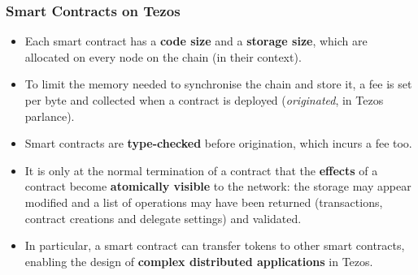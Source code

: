 \documentclass[compress,dvips,xcolor={dvipsnames},t]{beamer}
\begin{document}
\begin{frame}
  \frametitle{Smart Contracts on Tezos}

  \begin{itemize}

    \item Each smart contract has a \textbf{code size} and a
      \textbf{storage size}, which are allocated on every node on the
      chain (in their context).

    \item To limit the memory needed to synchronise the chain and
      store it, a fee is set per byte and collected when a contract is
      deployed (\emph{originated}, in Tezos parlance).

      \item Smart contracts are \textbf{type\hyp{}checked} before
        origination, which incurs a fee too.

    \item It is only at the normal termination of a contract that the
      \textbf{effects} of a contract become \textbf{atomically
        visible} to the network: the storage may appear modified and a
      list of operations may have been returned (transactions,
      contract creations and delegate settings) and validated.

    \item In particular, a smart contract can transfer tokens to other
      smart contracts, enabling the design of \textbf{complex
        distributed applications} in Tezos.

  \end{itemize}

\end{frame}

\end{document}
